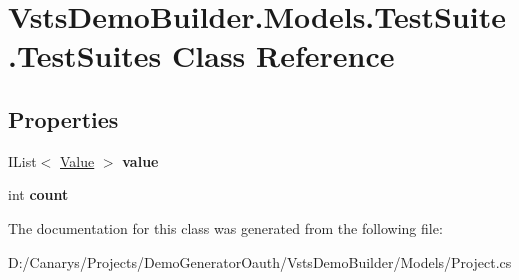 \hypertarget{class_vsts_demo_builder_1_1_models_1_1_test_suite_1_1_test_suites}{}\section{Vsts\+Demo\+Builder.\+Models.\+Test\+Suite.\+Test\+Suites Class Reference}
\label{class_vsts_demo_builder_1_1_models_1_1_test_suite_1_1_test_suites}
\subsection*{Properties}
\begin{DoxyCompactItemize}
\item 
\mbox{\label{class_vsts_demo_builder_1_1_models_1_1_test_suite_1_1_test_suites_a41004d031eacc1bf43cad6aafabeec77}} 
I\+List$<$ \mbox{\hyperlink{class_vsts_demo_builder_1_1_models_1_1_test_suite_1_1_value}{Value}} $>$ {\bfseries value}
\item 
\mbox{\label{class_vsts_demo_builder_1_1_models_1_1_test_suite_1_1_test_suites_acb3e1c850a03b06c28a77a7f16191f68}} 
int {\bfseries count}
\end{DoxyCompactItemize}


The documentation for this class was generated from the following file\+:\begin{DoxyCompactItemize}
\item 
D\+:/\+Canarys/\+Projects/\+Demo\+Generator\+Oauth/\+Vsts\+Demo\+Builder/\+Models/Project.\+cs\end{DoxyCompactItemize}
